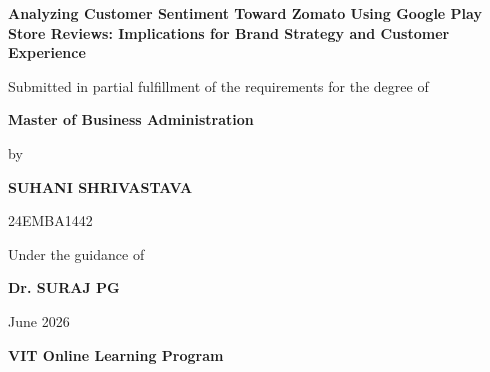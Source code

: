 \documentclass[12pt,a4paper]{report}
\newcommand{\projecttitle}{Analyzing Customer Sentiment Toward Zomato Using Google Play Store Reviews: Implications for Brand Strategy and Customer Experience}
\newcommand{\studentname}{SUHANI SHRIVASTAVA}
\newcommand{\regnumber}{24EMBA1442}
\newcommand{\guidename}{Dr. SURAJ PG}
\newcommand{\submissionmonthyear}{June 2026}
\newcommand{\institutionname}{VIT Online Learning Program}
\newcommand{\programname}{Master of Business Administration}
\begin{document}

\begin{titlepage}
    \begin{center}
        \vspace*{1.0cm}

        {\Large\bfseries \projecttitle \par}

        \vspace{1.5cm}

        Submitted in partial fulfillment of the requirements for the degree of

        \vspace{0.5cm}

        {\large\bfseries \programname \par}

        \vspace{1.2cm}

        by

        \vspace{0.8cm}

        {\large\bfseries \studentname \par}
        {\large \regnumber \par}

        \vspace{1.2cm}

        Under the guidance of

        \vspace{0.5cm}

        {\large\bfseries \guidename \par}

        \vfill

        {\large \submissionmonthyear \par}
        \vspace{0.4cm}
        {\large\bfseries \institutionname \par}
    \end{center}
\end{titlepage}


\clearpage


\clearpage


\clearpage


\clearpage

\tableofcontents
\clearpage

\listoftables
\clearpage

\listoffigures
\clearpage










\clearpage

\end{document}
